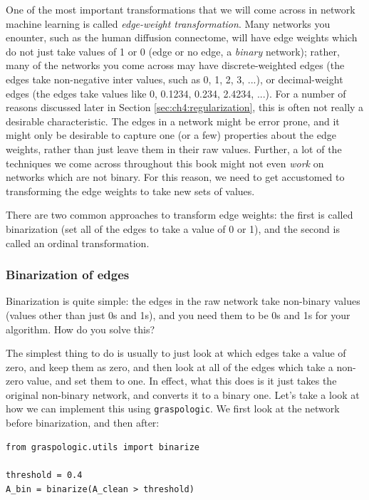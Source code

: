 One of the most important transformations that we will come across in network machine learning is called \emph{edge-weight transformation}. Many networks you enounter, such as the human diffusion connectome, will have edge weights which do not just take values of 1 or 0 (edge or no edge, a \emph{binary} network); rather, many of the networks you come across may have discrete-weighted edges (the edges take non-negative inter values, such as 0, 1, 2, 3, ...), or decimal-weight edges (the edges take values like 0, 0.1234, 0.234, 2.4234, ...). For a number of reasons discussed later in Section \ref{sec:ch4:regularization}, this is often not really a desirable characteristic.  The edges in a network might be error prone, and it might only be desirable to capture one (or a few) properties about the edge weights, rather than just leave them in their raw values. Further, a lot of the techniques we come across throughout this book might not even \emph{work} on networks which are not binary. For this reason, we need to get accustomed to transforming the edge weights to take new sets of values.

There are two common approaches to transform edge weights: the first is called binarization (set all of the edges to take a value of 0 or 1), and the second is called an ordinal transformation. 

\subsubsection{Binarization of edges} 

Binarization is quite simple: the edges in the raw network take non-binary values (values other than just 0s and 1s), and you need them to be 0s and 1s for your algorithm. How do you solve this? 

The simplest thing to do is usually to just look at which edges take a value of zero, and keep them as zero, and then look at all of the edges which take a non-zero value, and set them to one. In effect, what this does is it just takes the original non-binary network, and converts it to a binary one. Let's take a look at how we can implement this using \texttt{graspologic}. We first look at the network before binarization, and then after:

\begin{lstlisting}[style=python]
from graspologic.utils import binarize

threshold = 0.4
A_bin = binarize(A_clean > threshold)
\end{lstlisting}

